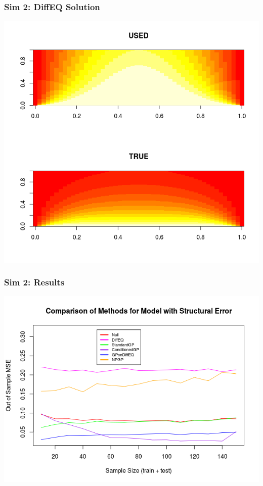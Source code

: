 \documentclass{beamer}
\begin{document}
	\begin{frame}
		\frametitle{Sim 2: DiffEQ Solution}
		
		\includegraphics[scale=0.5]{PrezImage9.png}
		
	\end{frame}
	
	\begin{frame}
		\frametitle{Sim 2: Results}
		
		\includegraphics[scale=0.5]{PrezImage1.png}
		
	\end{frame}
	
\end{document}
